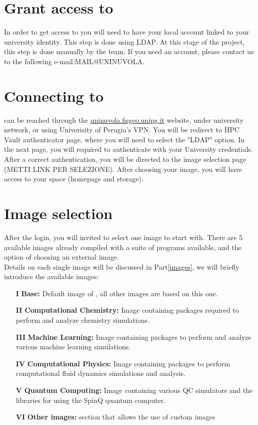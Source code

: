\section{Grant access to \uninuvola}
In order to get access to \uninuvola you will need to have your local account linked to your university identity. This step is done using LDAP. At this stage of the project, this step is done manually by the \uninuvola team. If you need an account, please contact us to the following e-mail:MAIL@UNINUVOLA.\\ 

\section{Connecting to \uninuvola}
\uninuvola can be reached through the \href{uninuvola.fisgeo.unipg.it/}{uninuvola.fisgeo.unipg.it} website, under university network, or using Univerisity of Perugia's VPN. You will be redirect to HPC Vault authenticator page, where you will need to select the "LDAP" option. In the next page, you will required to authenticate with your University credentials. After a correct authentication, you will be directed to the \jupyterhub image selection page (METTI LINK PER SELEZIONE). After choosing your image, you will have access to your space (homepage and storage). \\

\section{Image selection}
After the login, you will invited to select one image to start with. There are 5 available images already compiled with a suite of programs available, and the option of  choosing an external image.  \\

Details on each single image will be discussed in Part\ref{images}, we will briefly introduce the available images:
\begin{itemize}
    \item[\textbf{I}] \textbf{\uninuvola}  \textbf{Base:} Default image of \uninuvola, all other images are based on this one. 
    \item[\textbf{II}] \textbf{Computational Chemistry:} Image containing packages required to perform and analyze chemistry simulations.     
    \item[\textbf{III}] \textbf{Machine Learning:} Image containing packages to perform and analyze various machine learning simulations. 
    \item[\textbf{IV}] \textbf{Computational Physics:} Image containing packages to perform computational fluid dynamics simulations and analysis.
    \item[\textbf{V}] \textbf{Quantum Computing:} Image containing various QC simulators and the libraries for using the SpinQ quantum computer.
    \item[\textbf{VI}] \textbf{Other images:} section that allows the use of custom images
\end{itemize}


